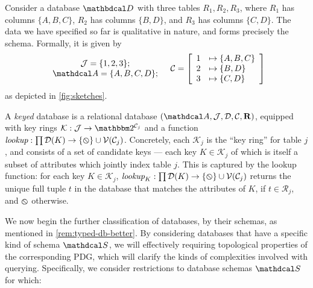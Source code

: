 \documentclass{article}
\theoremstyle{plain}
\theoremstyle{definition}
\theoremstyle{remark}
\newcommand\two{\mathbbm 2}
\newcommand{\D}{\mathbdcal D} %
\newcommand{\Attrs}{\mathdcal A}
\newcommand{\Idx}{\mathcal J}
\newcommand{\Doms}{{\mathcal D}}
\newcommand{\Rels}{{\mathbf R}}
\newcommand{\Cols}{\mathcal C}%
\newcommand{\Sch}{\mathdcal S}%
\newcommand{\arity}{\mathit{ar}}
\newcommand{\V}{\mathcal V}
\newcommand{\none}{\varobslash}
\begin{document}
\medskip
\begin{example}\label{ex:abcd}
	Consider a database $\D$ with three tables $R_1, R_2, R_3$, where $R_1$ has columns $\{A,B,C\}$, $R_2$ has columns $\{B,D\}$, and $R_3$ has columns $\{C,D\}$. The data we have specified so far is qualitative in nature, and forms precisely the schema.
	Formally, it is given by
	\[ 
	\begin{array}{c}
		\Idx = \{1,2,3\};\\
		\Attrs = \{A,B,C,D\};
	\end{array}
	\quad
		\Cols = \left[\begin{array}{rl}
				1 &\mapsto \{A, B, C\} \\
				2 &\mapsto \{ B, D \} \\
				3 &\mapsto \{C, D\}
			\end{array}\right]
\] 
	as depicted in \cref{fig:sketches}.
\end{example}

\begin{defn}
	A \emph{keyed} database is a relational database $(\Attrs, \Idx, \Doms, \Cols, \Rels)$, equipped with key rings $\mathcal K : \Idx \to \two^{\Cols_j}$ and a function $\textit{lookup} : \prod\Doms(K) \to \{\none\} \cup \V(\Cols_j)$. Concretely, each $\mathcal K_j$ is the ``key ring'' for table $j$, and consists of a set of candidate keys --- each key $K \in \mathcal K_j$ of which is itself a subset of attributes which jointly index table $j$. This is captured by the lookup function: for each key $K \in \mathcal K_j$, $\textit{lookup}_K : \prod\Doms(K) \to  \{\none\} \cup \V(\Cols_j)$ returns the unique full tuple $t$ in the database that matches the attributes of $K$, if $t \in \mathcal R_j$, and $\none$ otherwise.
\end{defn}

We now begin the further classification of databases, by their schemas, as mentioned in \cref{rem:typed-db-better}.  
By considering databases that have a specific kind of schema $\Sch$, we will effectively requiring topological properties of the corresponding PDG, which will clarify the kinds of complexities involved with querying. Specifically, we consider restrictions to database schemas $\Sch$ for which:
\end{document}
